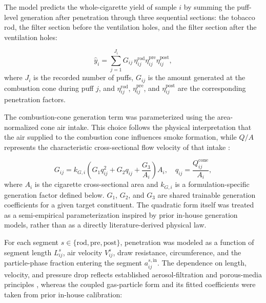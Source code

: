 \documentclass[11pt]{article}
\begin{document}
The model predicts the whole-cigarette yield of sample $i$ by summing the puff-level generation after penetration through three sequential sections: the tobacco rod, the filter section before the ventilation holes, and the filter section after the ventilation holes:

\[
\hat{y}_i=\sum_{j=1}^{J_i}G_{ij}\,
\eta_{ij}^{\mathrm{rod}}\eta_{ij}^{\mathrm{pre}}\eta_{ij}^{\mathrm{post}},
\]
where $J_i$ is the recorded number of puffs, $G_{ij}$ is the amount generated at the combustion cone during puff $j$, and $\eta_{ij}^{\mathrm{rod}}$, $\eta_{ij}^{\mathrm{pre}}$, and $\eta_{ij}^{\mathrm{post}}$ are the corresponding penetration factors.

The combustion-cone generation term was parameterized using the area-normalized cone air intake. This choice follows the physical interpretation that the air supplied to the combustion cone influences smoke formation, while $Q/A$ represents the characteristic cross-sectional flow velocity of that intake \cite{torero2020smouldering,pauwels2018ventilation,xu2020airfiltering}:

\[
G_{ij}=k_{G,i}\left(G_1q_{ij}^{2}+G_2q_{ij}+\frac{G_3}{A_i}\right)A_i,
\quad
q_{ij}=\frac{Q_{ij}^{\mathrm{cone}}}{A_i},
\]
where $A_i$ is the cigarette cross-sectional area and $k_{G,i}$ is a formulation-specific generation factor defined below. $G_1$, $G_2$, and $G_3$ are shared trainable generation coefficients for a given target constituent. The quadratic form itself was treated as a semi-empirical parameterization inspired by prior in-house generation models, rather than as a directly literature-derived physical law.

For each segment $s\in\{\mathrm{rod},\mathrm{pre},\mathrm{post}\}$, penetration was modeled as a function of segment length $L_{ij}^{s}$, air velocity $V_{ij}^{s}$, draw resistance, circumference, and the particle-phase fraction entering the segment $a_{ij}^{s,\mathrm{in}}$. The dependence on length, velocity, and pressure drop reflects established aerosol-filtration and porous-media principles \cite{liu2020particulate,xu2020airfiltering}, whereas the coupled gas-particle form and its fitted coefficients were taken from prior in-house calibration:
\end{document}
